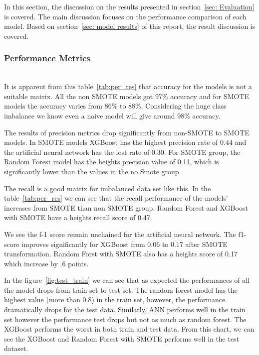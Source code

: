 In this section, the discussion on the results presented in section~\ref{sec: Evaluation} is covered. The main discussion focuses on the performance comparison of each model. Based on section~\ref{sec: model results} of this report, the result discussion is covered. 

\subsubsection{Performance Metrics}\hspace*{\fill} \\
It is apparent from this table~\ref{tab:per_res} that accuracy for the models is not a suitable matrix. All the non SMOTE models got 97\% accuracy and for SMOTE models the accuracy varies from 86\% to 88\%. Considering the huge class imbalance we know even a naive model will give around 98\% accuracy. 

The results of precision metrics drop significantly from non-SMOTE to SMOTE models. In SMOTE models XGBoost has the highest precision rate of 0.44 and the artificial neural network has the lost rate of 0.30. For SMOTE group, the Random Forest model has the heights precision value of 0.11, which is significantly lower than the values in the no Smote group.   

The recall is a good matrix for imbalanced data set like this. In the table~\ref{tab:per_res} we can see that the recall performance of the models' increases from SMOTE than non SMOTE group. Random Forest and XGBoost with SMOTE have a heights recall score of 0.47. 

We see the f-1 score remain unchained for the artificial neural network. The f1-score improves significantly for XGBoost from 0.06 to 0.17 after SMOTE transformation. Random Forst with SMOTE also has a heights score of 0.17 which increase by .6 points. 


In the figure~\ref{fig:test_train} we can see that as expected the performances of all the model drops from train set to test set. The random forest model has the highest value (more than 0.8) in the train set, however, the performance dramatically drops for the test data. Similarly, ANN performs well in the train set however the performance test drops but not as much as random forest. The XGBoost performs the worst in both train and test data. From this chart, we can see the XGBoost and Random Forest with SMOTE performs well in the test dataset. 



